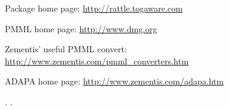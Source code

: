 \begin{Author}\relax
{}
\end{Author}
\begin{References}\relax
Package home page: \url{http://rattle.togaware.com}

PMML home page: \url{http://www.dmg.org}

Zementis' useful PMML convert: \url{http://www.zementis.com/pmml_converters.htm}

ADAPA home page: \url{http://www.zementis.com/adapa.htm}
\end{References}
\begin{SeeAlso}\relax
{}.
.
\end{SeeAlso}

